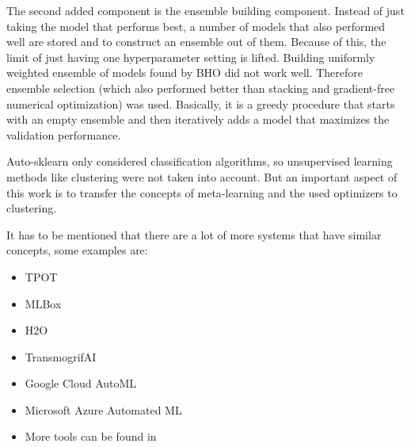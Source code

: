 The second added component is the ensemble building component.
Instead of just taking the model that performs best, a number of models that also performed well are stored and to construct an ensemble out of them.
Because of this, the limit of just having one hyperparameter setting is lifted.
Building uniformly weighted ensemble of models found by \gls{BHO} did not work well.
Therefore ensemble selection \cite{CaruanaEnsembleModels} (which also performed better than stacking and gradient-free numerical optimization) was used.
Basically, it is a greedy procedure that starts with an empty ensemble and then iteratively adds a model that maximizes the validation performance.

Auto-sklearn only considered classification algorithms, so unsupervised learning methods like clustering were not taken into account.
But an important aspect of this work is to transfer the concepts of meta-learning and the used optimizers to clustering.

It has to be mentioned that there are a lot of more systems that have similar concepts, some examples are:

\begin{itemize}
    \item TPOT \cite{HomeTPOT}
    \item MLBox \cite{HomeDocumentation}
    \item H2O \cite{OverviewDocumentation}
    \item TransmogrifAI \cite{TransmogrifAIEngineering}
    \item Google Cloud AutoML \cite{CloudCloud}
    \item Microsoft Azure Automated ML \cite{AnnouncingAzure}
    \item More tools can be found in \cite{Elshawi2019AutomatedChallenges}
\end{itemize}


